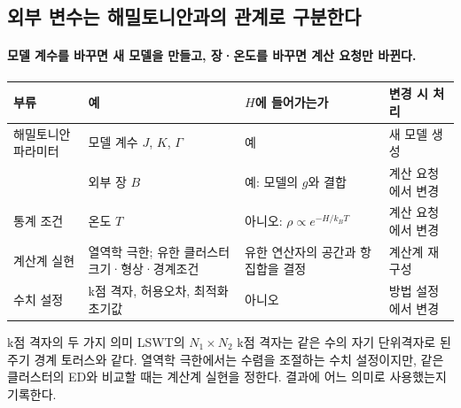 \subsection{외부 변수는 해밀토니안과의 관계로 구분한다}\label{external-variables}
\begingroup%
  \framesubtitle{모델 계수를 바꾸면 새 모델을 만들고, 장·온도를 바꾸면 계산 요청만 바뀐다.}
  \small
  \begin{tabularx}{\textwidth}{@{}p{2.7cm}p{3.9cm}Yp{2.9cm}@{}}
    \toprule
    부류 & 예 & $H$에 들어가는가 & 변경 시 처리 \\
    \midrule
    해밀토니안 파라미터 & 모델 계수 $J$, $K$, $\Gamma$ & 예 & 새 모델 생성 \\
     & 외부 장 $B$ & 예: 모델의 $g$와 결합 & 계산 요청에서 변경 \\
    통계 조건 & 온도 $T$ & 아니오: $\rho\propto e^{-H/k_BT}$ & 계산 요청에서 변경 \\
    계산계 실현 & 열역학 극한; 유한 클러스터 크기·형상·경계조건 & 유한 연산자의 공간과 항 집합을 결정 & 계산계 재구성 \\
    수치 설정 & k점 격자, 허용오차, 최적화 초기값 & 아니오 & 방법 설정에서 변경 \\
    \bottomrule
  \end{tabularx}
  \par\medskip
  \begin{mdcallout}[note]{k점 격자의 두 가지 의미}
    LSWT의 $N_1\times N_2$ k점 격자는 같은 수의 자기 단위격자로 된 주기 경계 토러스와 같다.
    열역학 극한에서는 수렴을 조절하는 수치 설정이지만, 같은 클러스터의 ED와 비교할 때는
    계산계 실현을 정한다. 결과에 어느 의미로 사용했는지 기록한다.
  \end{mdcallout}
\endgroup


